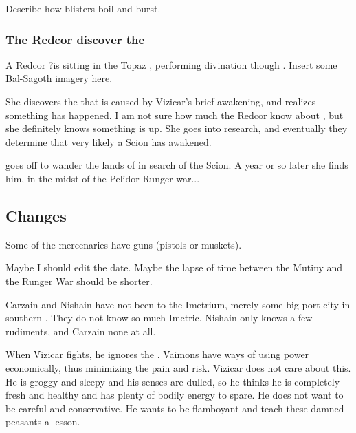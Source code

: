 \begin{garbage}
Describe how blisters boil and burst. 





\subsubsection{The Redcor discover the \vertexspike{}}
A Redcor \matron\dash\Esmerel?\dash is sitting in the Topaz \Chateau, performing divination though . Insert some Bal-Sagoth imagery here. 


She discovers the \vertexspike{} that is caused by Vizicar's brief awakening, and realizes something has happened. I am not sure how much the Redcor know about \vertices, but she definitely knows something is up. She goes into research, and eventually they determine that very likely a Scion has awakened. 

\Esmerel{} goes off to wander the lands of \Velcad{} in search of the Scion. A year or so later she finds him, in the midst of the Pelidor-Runger war...






\subsection{Changes}
Some of the mercenaries have guns (pistols or muskets).

Maybe I should edit the date. 
Maybe the lapse of time between the Mutiny and the Runger War should be shorter. 

Carzain and Nishain have not been to the Imetrium, merely some big port city in southern \Scyrum. 
They do not know so much Imetric. 
Nishain only knows a few rudiments, and Carzain none at all. 

When Vizicar fights, he ignores the . 
\Itzach{} Vaimons have ways of using power economically, thus minimizing the pain and risk. 
Vizicar does not care about this. 
He is groggy and sleepy and his senses are dulled, so he thinks he is completely fresh and healthy and has plenty of bodily energy to spare. 
He does not want to be careful and conservative. 
He wants to be flamboyant and teach these damned peasants a lesson. 


\end{garbage}

